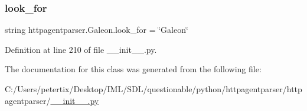 \subsubsection{\texorpdfstring{look\+\_\+for}{look\_for}}
{\footnotesize\ttfamily string httpagentparser.\+Galeon.\+look\+\_\+for = \char`\"{}Galeon\char`\"{}\hspace{0.3cm}{\ttfamily [static]}}



Definition at line 210 of file \+\_\+\+\_\+init\+\_\+\+\_\+.\+py.



The documentation for this class was generated from the following file\+:\begin{DoxyCompactItemize}
\item 
C\+:/\+Users/petertix/\+Desktop/\+I\+M\+L/\+S\+D\+L/questionable/python/httpagentparser/httpagentparser/\hyperlink{____init_____8py}{\+\_\+\+\_\+init\+\_\+\+\_\+.\+py}\end{DoxyCompactItemize}

